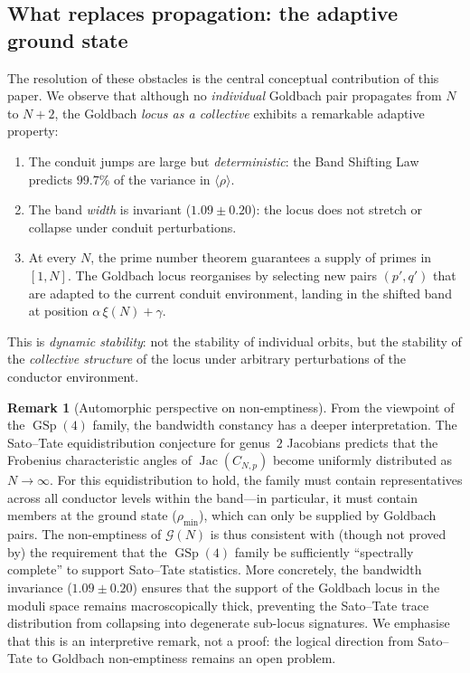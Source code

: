 \documentclass[11pt,a4paper]{article}
\theoremstyle{definition}
\newtheorem{remark}[theorem]{Remark}
\DeclareMathOperator{\GSp}{GSp}
\DeclareMathOperator{\Jac}{Jac}
\begin{document}
\subsection{What replaces propagation: the adaptive ground state}

The resolution of these obstacles is the central conceptual contribution of this
paper.  We observe that although no \emph{individual} Goldbach pair propagates from
$N$ to $N + 2$, the Goldbach \emph{locus as a collective} exhibits a remarkable
adaptive property:

\begin{enumerate}
\item The conduit jumps are large but \emph{deterministic}: the Band Shifting Law
  predicts $99.7\%$ of the variance in $\langle\rho\rangle$.

\item The band \emph{width} is invariant ($1.09 \pm 0.20$): the locus does not
  stretch or collapse under conduit perturbations.

\item At every $N$, the prime number theorem guarantees a supply of primes in
  $[1, N]$.  The Goldbach locus reorganises by selecting new pairs $(p', q')$ that
  are adapted to the current conduit environment, landing in the shifted band at
  position $\alpha\,\xi(N) + \gamma$.
\end{enumerate}

This is \emph{dynamic stability}: not the stability of individual orbits, but
the stability of the \emph{collective structure} of the locus under arbitrary
perturbations of the conductor environment.

\begin{remark}[Automorphic perspective on non-emptiness]\label{rem:ST}
  From the viewpoint of the $\GSp(4)$ family, the bandwidth constancy has a
  deeper interpretation.  The Sato--Tate equidistribution conjecture for
  genus~$2$ Jacobians predicts that the Frobenius characteristic angles of
  $\Jac(C_{N,p})$ become uniformly distributed as $N \to \infty$.  For this
  equidistribution to hold, the family must contain representatives across
  all conductor levels within the band---in particular, it must contain members
  at the ground state ($\rho_{\min}$), which can only be supplied by Goldbach
  pairs.  The non-emptiness of $\mathscr{G}(N)$ is thus consistent with
  (though not proved by) the requirement that the $\GSp(4)$ family be
  sufficiently ``spectrally complete'' to support Sato--Tate statistics.
  More concretely, the bandwidth invariance ($1.09 \pm 0.20$) ensures that the
  support of the Goldbach locus in the moduli space remains macroscopically thick,
  preventing the Sato--Tate trace distribution from collapsing into degenerate
  sub-locus signatures.
  We emphasise that this is an interpretive remark, not a proof: the logical
  direction from Sato--Tate to Goldbach non-emptiness remains an open problem.
\end{remark}
\end{document}

